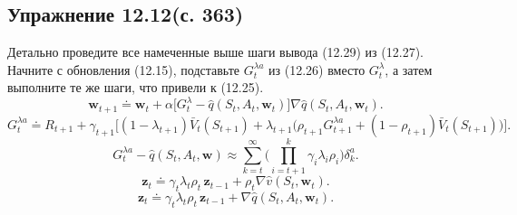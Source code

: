 \subsection{Упражнение 12.12(с. 363)}
Детально проведите все намеченные выше шаги вывода (12.29) из (12.27). Начните с
обновления (12.15), подставьте $G_t^{\lambda a}$ из (12.26) вместо $G_t^\lambda$, а
затем выполните те же шаги, что привели к (12.25).
\begin{equation}
    \mathbf w_{t+1} \doteq \mathbf w_t + \alpha\big[G_t^\lambda - \hat q(S_t,A_t,\mathbf w_t)\big]\nabla\hat q(S_t,A_t,\mathbf w_t).
    \tag{12.15}
\end{equation}
\begin{equation}
    G_t^{\lambda a} \doteq R_{t+1} + \gamma_{t+1}\Big[(1-\lambda_{t+1})\bar V_t(S_{t+1})
    + \lambda_{t+1}\big(\rho_{t+1}G_{t+1}^{\lambda a} + (1-\rho_{t+1})\bar V_t(S_{t+1})\big)\Big].
    \tag{12.26}
\end{equation}
\begin{equation}
    G_t^{\lambda a} - \hat q(S_t,A_t,\mathbf w) \approx
    \sum_{k=t}^{\infty}\Big(\prod_{i=t+1}^{k}\gamma_i\lambda_i\rho_i\Big)\delta_k^a.
    \tag{12.27}
\end{equation}
\begin{equation}
    \mathbf z_t \doteq \gamma_t\lambda_t\rho_t\,\mathbf z_{t-1} + \rho_t\nabla\hat v(S_t,\mathbf w_t).
    \tag{12.25}
\end{equation}
\begin{equation}
    \mathbf z_t \doteq \gamma_t\lambda_t\rho_t\,\mathbf z_{t-1} + \nabla\hat q(S_t,A_t,\mathbf w_t).
    \tag{12.29}
\end{equation}
